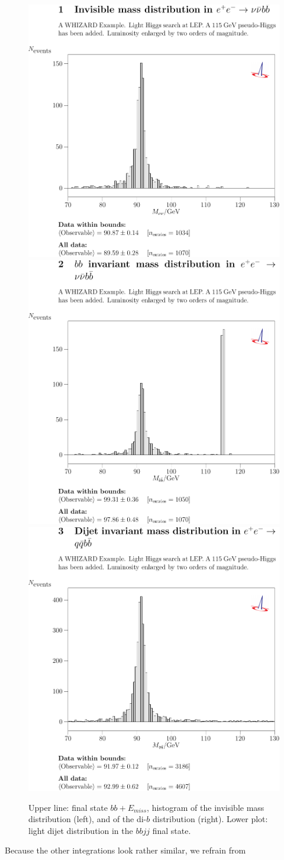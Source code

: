 \documentclass[12pt]{book}
\begin{document}
\begin{figure}
  \centering
  \includegraphics[width=.48\textwidth]{lep_higgs_1}
  \includegraphics[width=.48\textwidth]{lep_higgs_2}
  \\\vspace{5mm}
  \includegraphics[width=.48\textwidth]{lep_higgs_3}
  \caption{Upper line: final state $bb + E_{miss}$, histogram of
    the invisible mass distribution (left), and of the di-$b$
    distribution (right). Lower plot: light dijet distribution in the
    $bbjj$ final state.}
  \label{fig:lep_higgs}
\end{figure}
Because the other integrations look rather similar, we refrain from
\end{document}
